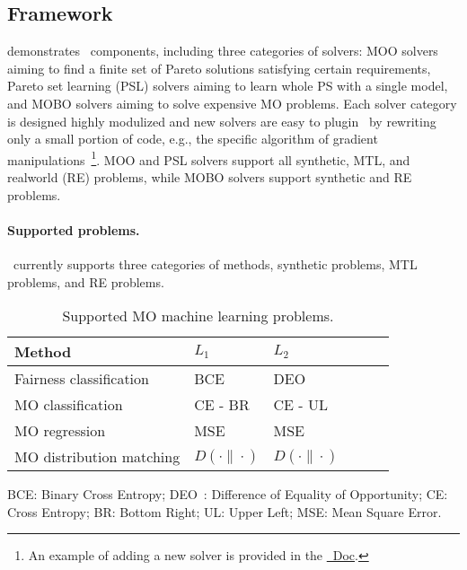 \subsection{Framework} \label{sec:framework}
 demonstrates \algoname~components, including three categories of solvers: MOO solvers aiming to find a finite set of Pareto solutions satisfying certain requirements, Pareto set learning (PSL) solvers aiming to learn whole PS with a single model, and MOBO solvers aiming to solve expensive MO problems. Each solver category is designed highly modulized and new solvers are easy to plugin \algoname~by rewriting only a small portion of code, e.g., the specific algorithm of gradient manipulations~\footnote{An example of adding a new solver is provided in the \href{https://libmoondocs.readthedocs.io/en/latest/develop/add_method.html}{\algoname~Doc}.}. MOO and PSL solvers support all synthetic, MTL, and realworld (RE) problems, while MOBO solvers support synthetic and RE problems.

\paragraph{Supported problems.}
\algoname~currently supports three categories of methods, synthetic problems, MTL problems, and RE problems. 

\begin{wraptable}{r}{0.6\textwidth}
    \centering
    \vspace{-10pt}
    \caption{Supported MO machine learning problems.} \label{tab:supp:problems}
    \footnotesize
    \begin{threeparttable}
    \begin{tabular}{llllll}
        \toprule
        Method & $L_1$ & $L_2$ \\
        \midrule
        Fairness classification~\cite{ruchte2021scalable} & BCE & DEO \\
        MO classification~\cite{lin2019pareto} & CE - BR & CE - UL \\
        MO regression~\cite{hu2023revisiting} & MSE & MSE \\
        MO distribution matching & $D(\cdot \| \cdot)$ & $D(\cdot \| \cdot)$ \\
        \bottomrule
    \end{tabular}
    \begin{tablenotes}
        \item \noindent \tiny BCE: Binary Cross Entropy; DEO~\cite{padh2021addressing}: Difference of Equality of Opportunity; CE: Cross Entropy; BR: Bottom Right; UL: Upper Left; MSE: Mean Square Error. 
    \end{tablenotes}
    \end{threeparttable}
\end{wraptable}


